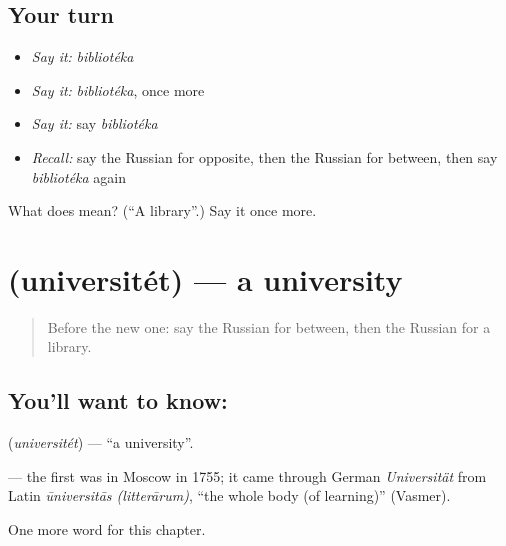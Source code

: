 \subsection*{Your turn}
\begin{itemize}
\raggedright
  \item \emph{Say it:} \emph{bibliotéka}
  \item \emph{Say it:} \emph{bibliotéka}, once more
  \item \emph{Say it:} say \emph{bibliotéka}
  \item \emph{Recall:} say the Russian for opposite, then the Russian for between, then say \emph{bibliotéka} again
\end{itemize}

\begin{tcolorbox}[breakable,colback=teal!4,colframe=teal!35!black,title={Before you move on}]
What does  mean? (\textquotedblleft{}A library\textquotedblright{}.) Say it once more.
\end{tcolorbox}
\section[\texorpdfstring{\ru{университет} (universitét)}{университет (universitét)}]{ (universitét) — a university}

\label{lesson:RU-C242-universitet}



\begin{quote}
Before the new one: say the Russian for between, then the Russian for a library.
\end{quote}

\subsection*{You'll want to know: }
\textbf{} (\emph{universitét}) — \textquotedblleft{}a university\textquotedblright{}.

\begin{cousinweb}
\textbf{} — the first was in Moscow in 1755; it came through German \emph{Universität} from Latin \emph{ūniversitās (litterārum)}, \textquotedblleft{}the whole body (of learning)\textquotedblright{} (Vasmer).
\end{cousinweb}

\begin{grammarlens}[title={What you've built}]
One more word for this chapter.
\end{grammarlens}

